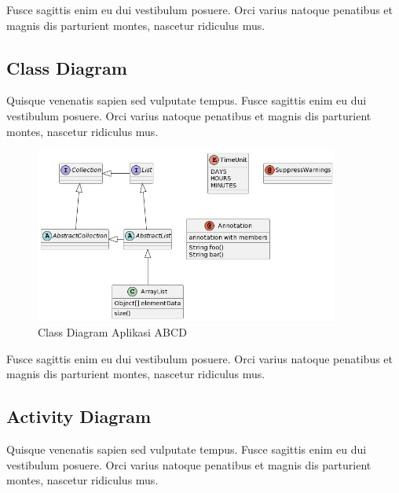 Fusce sagittis enim eu dui vestibulum posuere. Orci varius natoque penatibus et magnis dis parturient montes, nascetur ridiculus mus.

\subsection{Class Diagram}
Quisque venenatis sapien sed vulputate tempus. Fusce sagittis enim eu dui vestibulum posuere. Orci varius natoque penatibus et magnis dis parturient montes, nascetur ridiculus mus.

\begin{figure}[H]
    \centering
    \includegraphics[width=10cm]{assets/pics/dummy-class-diagram.png}
    \caption{Class Diagram Aplikasi ABCD}
    \label{fig:classDiagram}
\end{figure}

Fusce sagittis enim eu dui vestibulum posuere. Orci varius natoque penatibus et magnis dis parturient montes, nascetur ridiculus mus.

\subsection{Activity Diagram}
Quisque venenatis sapien sed vulputate tempus. Fusce sagittis enim eu dui vestibulum posuere. Orci varius natoque penatibus et magnis dis parturient montes, nascetur ridiculus mus.
